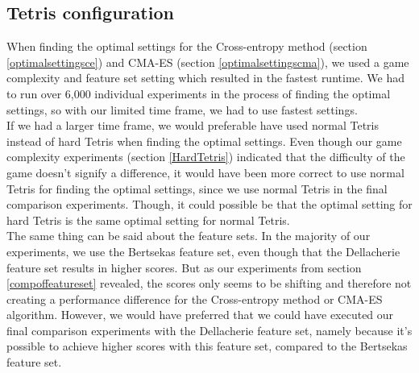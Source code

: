 \subsection{Tetris configuration}

When finding the optimal settings for the Cross-entropy method (section \ref{optimalsettingsce})
and CMA-ES (section \ref{optimalsettingscma}), we used a game complexity and feature set 
setting which resulted in the fastest runtime. We had to run over 6,000 individual experiments
in the process of finding the optimal settings, so with our limited time frame, we had
to use fastest settings.\\
If we had a larger time frame, we would preferable have used normal Tetris instead
of hard Tetris when finding the optimal settings. Even though our game complexity experiments
(section \ref{HardTetris}) indicated that the difficulty of the game doesn't signify a difference, it would have been more correct to use normal Tetris for finding the optimal settings, since
we use normal Tetris in the final comparison experiments. Though, it could possible be that the
optimal setting for hard Tetris is the same optimal setting for normal Tetris.\\
The same thing can be said about the feature sets. In the majority of our experiments, we
use the Bertsekas feature set, even though that the Dellacherie feature set results in
higher scores. But as our experiments from section \ref{compoffeatureset} revealed, the
scores only seems to be shifting and therefore not creating a performance difference for
the Cross-entropy method or CMA-ES algorithm. However, we would have preferred that we could have
executed our final comparison experiments with the Dellacherie feature set, namely because
it's possible to achieve higher scores with this feature set, compared to the Bertsekas feature
set.
